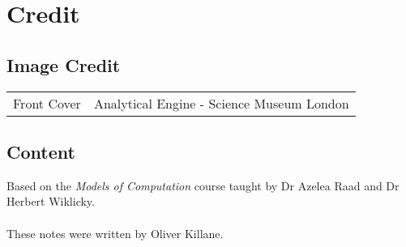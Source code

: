 \chapter{Credit}
\section*{Image Credit}
\begin{center}
	\begin{tabular}{r p{}}
        Front Cover & Analytical Engine - Science Museum London \\
	\end{tabular}
\end{center}

\section*{Content}
Based on the \textit{Models of Computation} course taught by Dr Azelea Raad and Dr Herbert Wiklicky.
\\
\\ These notes were written by Oliver Killane.
